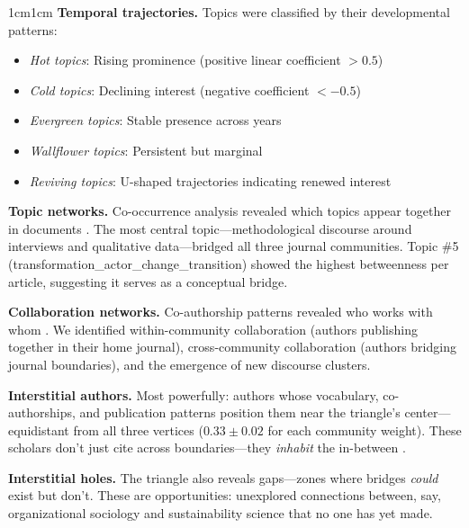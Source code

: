 \documentclass[../main.tex]{subfiles}
\begin{document}
\begin{adjustwidth}{1cm}{1cm}
\noindent\textbf{Temporal trajectories.} Topics were classified by their developmental patterns:
\begin{itemize}[leftmargin=2em, itemsep=0.1em]
    \item \textit{Hot topics}: Rising prominence (positive linear coefficient $> 0.5$)
    \item \textit{Cold topics}: Declining interest (negative coefficient $< -0.5$)
    \item \textit{Evergreen topics}: Stable presence across years
    \item \textit{Wallflower topics}: Persistent but marginal
    \item \textit{Reviving topics}: U-shaped trajectories indicating renewed interest
\end{itemize}


\noindent\textbf{Topic networks.} Co-occurrence analysis revealed which topics appear together in documents \cite{newman2010networks}. The most central topic---methodological discourse around interviews and qualitative data---bridged all three journal communities. Topic \#5 (transformation\_actor\_change\_transition) showed the highest betweenness per article, suggesting it serves as a conceptual bridge.

\noindent\textbf{Collaboration networks.} Co-authorship patterns revealed who works with whom \cite{newman2001structure}. We identified within-community collaboration (authors publishing together in their home journal), cross-community collaboration (authors bridging journal boundaries), and the emergence of new discourse clusters.

\noindent\textbf{Interstitial authors.} Most powerfully: authors whose vocabulary, co-authorships, and publication patterns position them near the triangle's center---equidistant from all three vertices ($0.33 \pm 0.02$ for each community weight). These scholars don't just cite across boundaries---they \textit{inhabit} the in-between \cite{burt1992structural}.

\noindent\textbf{Interstitial holes.} The triangle also reveals gaps---zones where bridges \textit{could} exist but don't. These are opportunities: unexplored connections between, say, organizational sociology and sustainability science that no one has yet made.

\end{adjustwidth}
\end{document}
